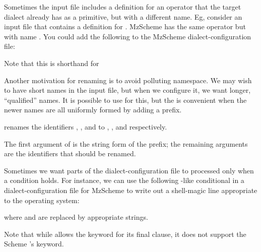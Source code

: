 Sometimes the input file includes a definition
for an operator that the target dialect already has as
a primitive, but with a different name.   Eg, consider
an input file that contains a definition for
.  MzScheme has the same operator but with
name .  You could add the following to
the MzScheme dialect-configuration file:


Note that this is shorthand for


Another motivation for renaming is to avoid polluting
namespace.  We may wish to have short names in the
input file, but when we configure it, we want longer,
``qualified'' names.  It is possible to use
 for this, but the
 is convenient when the newer names
are all uniformly formed by adding a prefix.


\n renames the identifiers , ,
and  to
, , and
 respectively.

The first argument of  is the
string form of the prefix; the remaining arguments are
the identifiers that should be renamed.


Sometimes we want parts of the dialect-configuration
file to processed only when a condition holds.  For
instance, we can use the following -like
conditional in
a dialect-configuration file for MzScheme to
write out a  shell-magic
line appropriate to the operating system:


\n where  and
 are replaced by
appropriate strings.

Note that while  allows the 
keyword for its final clause, it does not support the
Scheme 's \q{=>} keyword.


